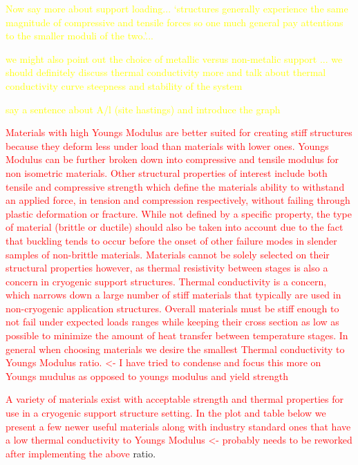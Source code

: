 \documentclass[final]{svjour2}
\begin{document}
\textcolor{yellow}{Now say more about support  loading... `structures generally experience the same magnitude of compressive and tensile forces so one much general pay attentions to the smaller moduli of the two.'...}

\textcolor{yellow}{we might also point out the choice of metallic versus non-metalic support ... we should definitely  discuss thermal conductivity more and talk about thermal conductivity curve  steepness and  stability of the system }

\textcolor{yellow}{say a sentence about A/l (site hastings) and introduce the graph  }

\textcolor{red}{Materials with high Youngs Modulus are better suited for creating stiff structures because they deform less under load than materials with lower ones.  Youngs Modulus can be further broken down into compressive and tensile modulus for non isometric materials. Other structural properties of interest include both tensile and compressive strength which define the materials ability to withstand an applied force, in tension and compression respectively, without failing through plastic deformation or fracture.  While not defined by a specific property, the type of material (brittle or ductile) should also be taken into account due to the fact that buckling tends to occur before the onset of other failure modes in slender samples of non-brittle materials.  Materials cannot be solely selected on their structural properties however, as thermal resistivity between stages is also a concern in cryogenic support structures. Thermal conductivity is a concern, which narrows down a large number of stiff materials that typically are used in non-cryogenic application structures.  Overall materials must be stiff enough to not fail under expected loads ranges while keeping their cross section as low as possible to minimize the amount of heat transfer between temperature stages.  In general when choosing materials we desire the smallest Thermal conductivity to Youngs Modulus ratio.\cite{Hastings1993} <- I have tried to condense and focus this more on Youngs mudulus as opposed to youngs modulus and yield strength  }


\textcolor{red}{A variety of materials exist with acceptable strength and thermal properties for use in a cryogenic support structure setting.  In the plot and table below we present a few newer useful materials along with industry standard ones that have a low thermal conductivity to Youngs Modulus <- probably needs to be reworked after implementing the above} ratio.\cite{Doty1981}\cite{Kasen1981}\cite{Runyan2008}\cite{Kellaris2013}\cite{Woodcraft2009}\cite{Woodcraft2009_2}\cite{Ventura2009}
\end{document}
